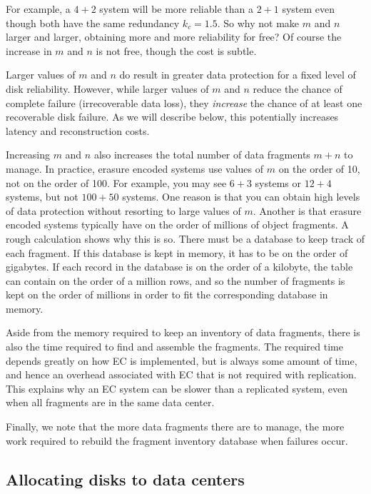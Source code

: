 \documentclass[11pt]{article}
\begin{document}
For example, a $4+2$ system will be more reliable than a $2+1$ system even though both have the same redundancy $k_c = 1.5$. So why not make $m$ and $n$ larger and larger, obtaining more and more reliability for free? Of course the increase in $m$ and $n$ is not free, though the cost is subtle.

Larger values of $m$ and $n$ do result in greater data protection for a fixed level of disk reliability. However, while larger values of $m$ and $n$ reduce the chance of complete failure (irrecoverable data loss), they \emph{increase} the chance of at least one recoverable disk failure. As we will describe below, this potentially increases latency and reconstruction costs.

Increasing $m$ and $n$ also increases the total number of data fragments $m+n$ to manage. In practice, erasure encoded systems use values of $m$ on the order of 10, not on the order of 100.  For example, you may see $6+3$ systems or $12+4$ systems, but not $100+50$ systems. One reason is that you can obtain high levels of data protection without resorting to large values of $m$. Another is that erasure encoded systems typically have on the order of millions of object fragments. A rough calculation shows why this is so. There must be a database to keep track of each fragment. If this database is kept in memory, it has to be on the order of gigabytes. If each record in the database is on the order of a kilobyte, the table can contain on the order of a million rows, and so the number of fragments is kept on the order of millions in order to fit the corresponding database in memory.

Aside from the memory required to keep an inventory of data fragments, there is also the time required to find and assemble the fragments. The required time depends greatly on how EC is implemented, but is always some amount of time, and hence an overhead associated with EC that is not required with replication. This explains why an EC system can be slower than a replicated system, even when all fragments are in the same data center.

Finally, we note that the more data fragments there are to manage, the more work required to rebuild the fragment inventory database when failures occur.

\subsection{Allocating disks to data centers} \label{DC}
\end{document}
